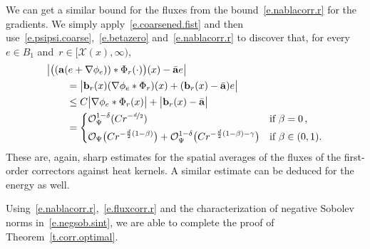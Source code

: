 \documentclass[11pt,twoside]{article} %
\numberwithin{equation}{section}
\newtheorem{theorem}{Theorem}[section]
\theoremstyle{definition}
\newcommand{\dataref}{\hyperref[e.data.def]{\textcolor{blue}{\ensuremath{\mathrm{data}}}}}
\let\originalleft\left
\let\originalright\right
\renewcommand{\left}{\mathopen{}\mathclose\bgroup\originalleft}
\renewcommand{\right}{\aftergroup\egroup\originalright}
\newcommand{\eps}{\varepsilon}
\renewcommand{\b}{\ensuremath{\mathbf{b}}}
\newcommand{\ep}{\eps}
\renewcommand{\a}{\mathbf{a}}
\newcommand{\ahom}{\bar{\a}}
\newcommand{\X}{\mathcal{X}}
\renewcommand{\O}{\mathcal{O}}
\newcommand{\indc}{\boldsymbol{1}}
\begin{document}
\smallskip

We can get a similar bound for the fluxes from the bound~\eqref{e.nablacorr.r} for the gradients. We simply apply~\eqref{e.coarsened.fist} and then use~\eqref{e.psipsi.coarse},~\eqref{e.betazero} and~\eqref{e.nablacorr.r} to discover that, for every~$e \in B_1$ and~$r \in [\X(x),\infty)$, 
\begin{align}
\label{e.fluxcorr.r}
\lefteqn{
\bigl| \bigl(  ( \a (e + \nabla \phi_e) )   \ast \Phi_r(\cdot)  \bigr) (x) - \ahom e  \bigr| 
} \qquad & 
\notag \\ & 
=
\bigl| \b_r(x) ( \nabla \phi_e \ast \Phi_r) (x) + (\b_r(x) - \ahom) e \bigr|
\notag \\ & 
\leq 
C \bigl| \nabla \phi_e \ast \Phi_r (x)  \bigr| 
+
\bigl| \b_r(x) - \ahom \bigr|
\notag \\ & 
=  
\left\{
\begin{aligned}
& \O_{\Psi}^{1-\delta} (C r^{-\nicefrac d2}) & \mbox{if} & \ \beta = 0\,,\\
&\O_{\Psi} \bigl( C r^{-\frac d2(1-\beta)} \bigr) + \O_{\Psi}^{1-\delta} \bigl( C r^{-\frac d2(1-\beta) - \gamma} \bigr)
 & \mbox{if} & \ \beta\in (0,1). \\
\end{aligned}
\right.
\end{align}
These are, again, sharp estimates for the spatial averages of the fluxes of the first-order correctors against heat kernels. A similar estimate can be deduced for the energy as well. 

\smallskip

Using~\eqref{e.nablacorr.r},~\eqref{e.fluxcorr.r} and the characterization of negative Sobolev norms in~\eqref{e.negsob.sint}, we are able to complete the proof of Theorem~\ref{t.corr.optimal}.

%
\end{document}
